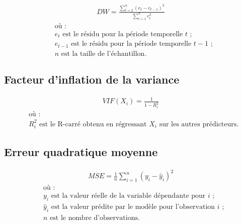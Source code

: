     \begin{equation}
    \label{annexes:equation-durbin-watson}
    \begin{aligned}
DW = \frac{\sum_{t=2}^{n} (e_t - e_{t-1})^2}{\sum_{t=1}^{n} e_t^2}
    \end{aligned}
    \end{equation}
\begin{align*}
    &\text{où~:} \\
    &e_t \text{ est le résidu pour la période temporelle } t\text{~;} \\
    &e_{t-1} \text{ est le résidu pour la période temporelle } t-1\text{~;} \\
    &n \text{ est la taille de l'échantillon.}
\end{align*}

\subsection{Facteur d'inflation de la variance}
    \label{annexes:methodologie-ols-vif}

    \begin{equation}
    \label{annexes:equation-vif}
    \begin{aligned}
VIF(X_i) = \frac{1}{1 - R_i^2}
    \end{aligned}
    \end{equation}
\begin{align*}
    &\text{où~:} \\
    &R_i^2 \text{ est le R-carré obtenu en régressant } X_i \text{ sur les autres prédicteurs.}
\end{align*}

\subsection{Erreur quadratique moyenne}
    \label{annexes:methodologie-ols-mse}

    \begin{equation}
    \label{annexes:equation:mse}
    \begin{aligned}
MSE = \frac{1}{n} \sum_{i=1}^{n} (y_i - \hat{y}_i)^2
    \end{aligned}
    \end{equation}
\begin{align*}
    &\text{où~:} \\
    &y_i \text{ est la valeur réelle de la variable dépendante pour } i\text{~;} \\
    &\hat{y}_i \text{ est la valeur prédite par le modèle pour l'observation } i\text{~;}\\
    &n \text{ est le nombre d'observations.}
\end{align*}